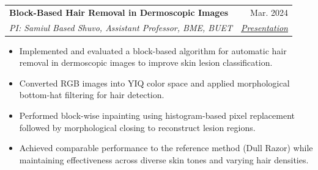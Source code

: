 \documentclass[letterpaper,11pt]{article}
\makeatletter
\newcommand{\resumeItem}[1]{
  \item\small{
    {#1 \vspace{-2pt}}
  }
}
\newcommand{\resumeSubheading}[4]{
  \vspace{-2pt}\item
    \begin{tabular*}{0.97\textwidth}[t]{l@{\extracolsep{\fill}}r}
      \textbf{#1} & #2 \\
      \textit{\small#3} & \textit{\small #4} \\
    \end{tabular*}\vspace{-7pt}
}
\newcommand{\resumeItemListStart}{\begin{itemize}}
\newcommand{\resumeItemListEnd}{\end{itemize}\vspace{-5pt}}
\makeatother
\begin{document}
        \resumeSubheading
          {Block-Based Hair Removal in Dermoscopic Images}{Mar. 2024}
          {PI: Samiul Based Shuvo, Assistant Professor, BME, BUET}{\href{https://docs.google.com/presentation/d/1H57hG-AVIsTq29g6gixoJ2ojP0UE2dMMcVTA_bPYCaY/edit?usp=sharing}{\underline{Presentation}}}
          \resumeItemListStart
            \resumeItem{Implemented and evaluated a block-based algorithm for automatic hair removal in dermoscopic images to improve skin lesion classification.}
            \resumeItem{Converted RGB images into YIQ color space and applied morphological bottom-hat filtering for hair detection.}
            \resumeItem{Performed block-wise inpainting using histogram-based pixel replacement followed by morphological closing to reconstruct lesion regions.}
            \resumeItem{Achieved comparable performance to the reference method (Dull Razor) while maintaining effectiveness across diverse skin tones and varying hair densities.}
          \resumeItemListEnd


\end{document}
